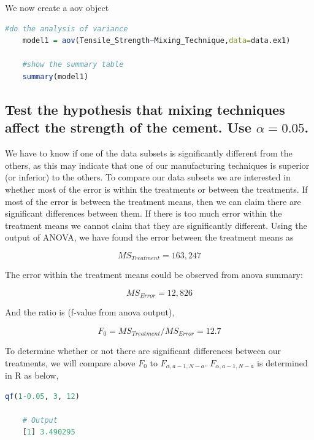\documentclass[11pt]{article}
\begin{document}
\clearpage



We now create a aov object

\begin{lstlisting}[language=R]
    #do the analysis of variance
    model1 = aov(Tensile_Strength~Mixing_Technique,data=data.ex1)

    #show the summary table
    summary(model1)
\end{lstlisting}



\subsection{Test the hypothesis that mixing techniques affect the strength of the cement. Use $\displaystyle \alpha=0.05$.}
We have to know if one of the data subsets is significantly different from the others, as this may indicate that one of our manufacturing techniques is superior (or inferior) to the others. To compare our data subsets we are interested in whether most of the error is within the treatments or between the treatments. If most of the error is between the treatment means, then we can claim there are significant differences between them. If there is too much error within the treatment means we cannot claim that they are significantly different. Using the output of ANOVA, we have found the error between the treatment means as 

$$\displaystyle MS_{Treatment} = 163,247$$

The error within the treatment means could be observed from anova summary: 

$$\displaystyle MS_{Error} = 12,826$$

And the ratio is (f-value from anova output),

$$\displaystyle F_0 = MS_{Treatment}/MS_{Error} = 12.7$$

To determine whether or not there are significant differences between our treatments, we will compare above $\displaystyle F_0$ to $\displaystyle F_{\alpha, a-1, N-a}$. $\displaystyle F_{\alpha, a-1, N-a}$ is determined in R as below,

\begin{lstlisting}[language=R]
    qf(1-0.05, 3, 12)   

    # Output
    [1] 3.490295
\end{lstlisting}
\end{document}
